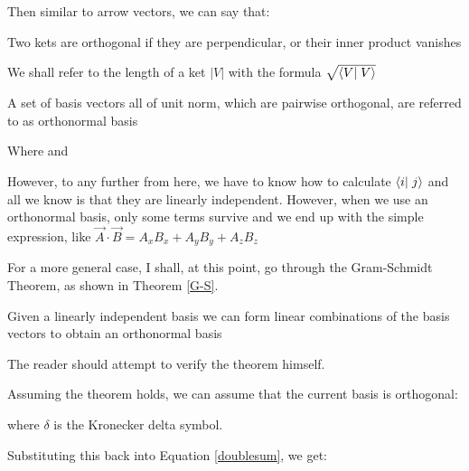 Then similar to arrow vectors, we can say that:
\begin{defi}
Two kets are orthogonal if they are perpendicular, or their inner product vanishes
\end{defi}
\begin{defi}
We shall refer to the length of a ket $|V|$ with the formula $\sqrt{\braket{V}{V}}$
\end{defi}
\begin{defi}
A set of basis vectors all of unit norm, which are pairwise orthogonal, are referred to as orthonormal basis
\end{defi}

\begin{form}
Where
and
\end{form}

However, to any further from here, we have to know how to calculate $\braket{i}{j}$ and all we know is that they are linearly independent. However, when we use an orthonormal basis, only some terms survive and we end up with the simple expression, like $\vec{A}\cdot\vec{B} = A_xB_x + A_yB_y + A_zB_z$ 

For a more general case, I shall, at this point, go through the Gram-Schmidt Theorem, as shown in Theorem \ref{G-S}.

\begin{form}\label{G-S}
Given a linearly independent basis we can form linear combinations of the basis vectors to obtain an orthonormal basis
\end{form}

The reader should attempt to verify the theorem himself.

Assuming the theorem holds, we can assume that the current basis is orthogonal:
 
where $\delta$ is the Kronecker delta symbol.
 
Substituting this back into Equation \ref{doublesum}, we get:


